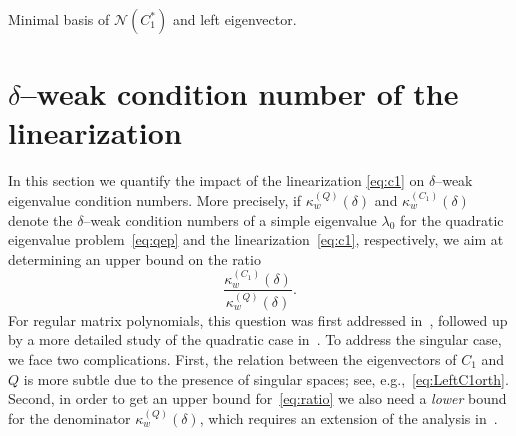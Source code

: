 \documentclass[12pt]{article}
\begin{document}
\begin{paragraph}{Minimal basis of $\mathcal{N}(C_1^*)$ and left eigenvector.}
\end{paragraph}

\section{$\delta$--weak condition number of the linearization}\label{s:DeltaCNLin}

In this section we quantify the impact of the linearization \eqref{eq:c1} on $\delta$--weak eigenvalue condition numbers. More precisely, if $\kappa^{(Q)}_w(\delta)$ and
$\kappa^{(C_1)}_w(\delta)$ denote the $\delta$--weak condition numbers of a simple eigenvalue $\lambda_0$ for the quadratic eigenvalue problem~\eqref{eq:qep} and the linearization~\eqref{eq:c1}, respectively, we aim at determining an upper bound on the ratio
\begin{equation} \label{eq:ratio}
    \frac{\kappa^{(C_1)}_w(\delta)}{\kappa^{(Q)}_w(\delta)}.
\end{equation}
For regular matrix polynomials, this question was first addressed in~\cite{higham2006conditioning}, followed up by a more detailed study of the quadratic case in~\cite{zeng2014backward}. 
To address the singular case, we face two complications. First, the relation between the eigenvectors of $C_1$ and $Q$ is more subtle due to the presence of singular spaces; see, e.g.,~\eqref{eq:LeftC1orth}. 
Second, in order to get an upper bound for~\eqref{eq:ratio} we also need a \emph{lower} bound for the denominator $\kappa^{(Q)}_w(\delta)$, which requires an extension of the analysis in~\cite{lotz2020wilkinson}.
\end{document}
